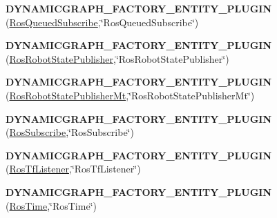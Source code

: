 \begin{DoxyCompactItemize}
\item 
{\bfseries D\+Y\+N\+A\+M\+I\+C\+G\+R\+A\+P\+H\+\_\+\+F\+A\+C\+T\+O\+R\+Y\+\_\+\+E\+N\+T\+I\+T\+Y\+\_\+\+P\+L\+U\+G\+IN} (\hyperlink{classdynamic__graph_1_1RosQueuedSubscribe}{Ros\+Queued\+Subscribe},\char`\"{}Ros\+Queued\+Subscribe\char`\"{})\hypertarget{namespacedynamic__graph_a63028fef53791a488a923c19cc7e38d5}{}\label{namespacedynamic__graph_a63028fef53791a488a923c19cc7e38d5}

\item 
{\bfseries D\+Y\+N\+A\+M\+I\+C\+G\+R\+A\+P\+H\+\_\+\+F\+A\+C\+T\+O\+R\+Y\+\_\+\+E\+N\+T\+I\+T\+Y\+\_\+\+P\+L\+U\+G\+IN} (\hyperlink{classdynamic__graph_1_1RosRobotStatePublisher}{Ros\+Robot\+State\+Publisher},\char`\"{}Ros\+Robot\+State\+Publisher\char`\"{})\hypertarget{namespacedynamic__graph_a0a5d8f5337da169b0f4d831871cc99a9}{}\label{namespacedynamic__graph_a0a5d8f5337da169b0f4d831871cc99a9}

\item 
{\bfseries D\+Y\+N\+A\+M\+I\+C\+G\+R\+A\+P\+H\+\_\+\+F\+A\+C\+T\+O\+R\+Y\+\_\+\+E\+N\+T\+I\+T\+Y\+\_\+\+P\+L\+U\+G\+IN} (\hyperlink{classdynamic__graph_1_1RosRobotStatePublisherMt}{Ros\+Robot\+State\+Publisher\+Mt},\char`\"{}Ros\+Robot\+State\+Publisher\+Mt\char`\"{})\hypertarget{namespacedynamic__graph_a8a74611454379ba67b22e2a1757fa177}{}\label{namespacedynamic__graph_a8a74611454379ba67b22e2a1757fa177}

\item 
{\bfseries D\+Y\+N\+A\+M\+I\+C\+G\+R\+A\+P\+H\+\_\+\+F\+A\+C\+T\+O\+R\+Y\+\_\+\+E\+N\+T\+I\+T\+Y\+\_\+\+P\+L\+U\+G\+IN} (\hyperlink{classdynamic__graph_1_1RosSubscribe}{Ros\+Subscribe},\char`\"{}Ros\+Subscribe\char`\"{})\hypertarget{namespacedynamic__graph_afd7b1f5e2b0f197f5a1013c2cb69d826}{}\label{namespacedynamic__graph_afd7b1f5e2b0f197f5a1013c2cb69d826}

\item 
{\bfseries D\+Y\+N\+A\+M\+I\+C\+G\+R\+A\+P\+H\+\_\+\+F\+A\+C\+T\+O\+R\+Y\+\_\+\+E\+N\+T\+I\+T\+Y\+\_\+\+P\+L\+U\+G\+IN} (\hyperlink{classdynamic__graph_1_1RosTfListener}{Ros\+Tf\+Listener},\char`\"{}Ros\+Tf\+Listener\char`\"{})\hypertarget{namespacedynamic__graph_a54b243d113826d8fabb7e8f089f11da9}{}\label{namespacedynamic__graph_a54b243d113826d8fabb7e8f089f11da9}

\item 
{\bfseries D\+Y\+N\+A\+M\+I\+C\+G\+R\+A\+P\+H\+\_\+\+F\+A\+C\+T\+O\+R\+Y\+\_\+\+E\+N\+T\+I\+T\+Y\+\_\+\+P\+L\+U\+G\+IN} (\hyperlink{classdynamic__graph_1_1RosTime}{Ros\+Time},\char`\"{}Ros\+Time\char`\"{})\hypertarget{namespacedynamic__graph_acab4b73fc7cde9df4e87c7d7d0611f99}{}\label{namespacedynamic__graph_acab4b73fc7cde9df4e87c7d7d0611f99}

\end{DoxyCompactItemize}
